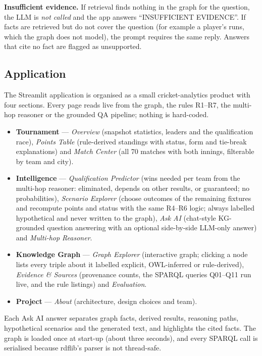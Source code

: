\textbf{Insufficient evidence.} If retrieval finds nothing in the graph for the question, the LLM is
\emph{not called} and the app answers ``INSUFFICIENT EVIDENCE''. If facts are retrieved but do not cover the
question (for example a player's runs, which the graph does not model), the prompt requires the same reply.
Answers that cite no fact are flagged as unsupported.



\subsection{Application}
The Streamlit \citep{streamlitdocs} application is organised as a small cricket-analytics product with four
sections. Every page reads live from the graph, the rules R1--R7, the multi-hop reasoner or the grounded QA
pipeline; nothing is hard-coded.
\begin{itemize}
  \item \textbf{Tournament} --- \emph{Overview} (snapshot statistics, leaders and the qualification race),
        \emph{Points Table} (rule-derived standings with status, form and tie-break explanations) and
        \emph{Match Center} (all 70 matches with both innings, filterable by team and city).
  \item \textbf{Intelligence} --- \emph{Qualification Predictor} (wins needed per team from the multi-hop
        reasoner: eliminated, depends on other results, or guaranteed; no probabilities), \emph{Scenario Explorer}
        (choose outcomes of the remaining fixtures and recompute points and status with the same R4--R6 logic;
        always labelled hypothetical and never written to the graph), \emph{Ask AI} (chat-style KG-grounded
        question answering with an optional side-by-side LLM-only answer) and \emph{Multi-hop Reasoner}.
  \item \textbf{Knowledge Graph} --- \emph{Graph Explorer} (interactive graph; clicking a node lists every
        triple about it labelled explicit, OWL-inferred or rule-derived), \emph{Evidence \& Sources} (provenance
        counts, the SPARQL queries Q01--Q11 run live, and the rule listings) and \emph{Evaluation}.
  \item \textbf{Project} --- \emph{About} (architecture, design choices and team).
\end{itemize}
Each Ask AI answer separates graph facts, derived results, reasoning paths, hypothetical scenarios and the
generated text, and highlights the cited facts. The graph is loaded once at start-up (about three seconds), and
every SPARQL call is serialised because rdflib's parser is not thread-safe.

